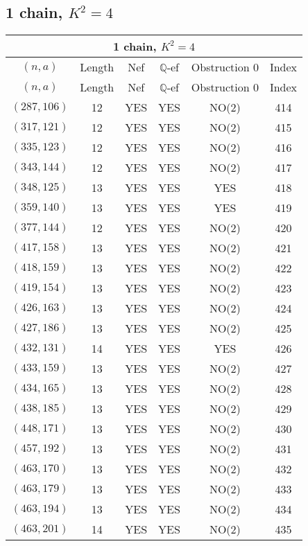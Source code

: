 \subsection{1 chain, \(K^2 = 4\)}
\begin{longtable}{|c|c|c|c|c|c|}
\hline
\multicolumn{6}{|c|}{1 chain, $K^2 = 4$}\\
\hline
$(n,a)$ & Length & Nef & $\mathbb Q$-ef & Obstruction 0 & Index\\
\hline
\endfirsthead

\hline
$(n,a)$ & Length & Nef & $\mathbb Q$-ef & Obstruction 0 & Index\\
\hline
\endhead
\hline
\endfoot

$(287, 106)$ & 12 & YES & YES & NO(2) & 414\\
$(317, 121)$ & 12 & YES & YES & NO(2) & 415\\
$(335, 123)$ & 12 & YES & YES & NO(2) & 416\\
$(343, 144)$ & 12 & YES & YES & NO(2) & 417\\
$(348, 125)$ & 13 & YES & YES & YES & 418\\
$(359, 140)$ & 13 & YES & YES & YES & 419\\
$(377, 144)$ & 12 & YES & YES & NO(2) & 420\\
$(417, 158)$ & 13 & YES & YES & NO(2) & 421\\
$(418, 159)$ & 13 & YES & YES & NO(2) & 422\\
$(419, 154)$ & 13 & YES & YES & NO(2) & 423\\
$(426, 163)$ & 13 & YES & YES & NO(2) & 424\\
$(427, 186)$ & 13 & YES & YES & NO(2) & 425\\
$(432, 131)$ & 14 & YES & YES & YES & 426\\
$(433, 159)$ & 13 & YES & YES & NO(2) & 427\\
$(434, 165)$ & 13 & YES & YES & NO(2) & 428\\
$(438, 185)$ & 13 & YES & YES & NO(2) & 429\\
$(448, 171)$ & 13 & YES & YES & NO(2) & 430\\
$(457, 192)$ & 13 & YES & YES & NO(2) & 431\\
$(463, 170)$ & 13 & YES & YES & NO(2) & 432\\
$(463, 179)$ & 13 & YES & YES & NO(2) & 433\\
$(463, 194)$ & 13 & YES & YES & NO(2) & 434\\
$(463, 201)$ & 14 & YES & YES & NO(2) & 435\\

\end{longtable}
